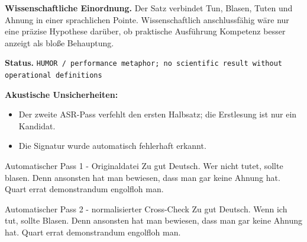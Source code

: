\documentclass[11pt,a4paper]{article}
\newcommand{\status}[1]{\texttt{#1}}
\begin{document}
\textbf{Wissenschaftliche Einordnung.} Der Satz verbindet Tun, Blasen, Tuten und Ahnung in einer sprachlichen Pointe. Wissenschaftlich anschlussfähig wäre nur eine präzise Hypothese darüber, ob praktische Ausführung Kompetenz besser anzeigt als bloße Behauptung.

\textbf{Status.} \status{HUMOR / performance metaphor; no scientific result without operational definitions}

\textbf{Akustische Unsicherheiten:}
\begin{itemize}
\item Der zweite ASR-Pass verfehlt den ersten Halbsatz; die Erstlesung ist nur ein Kandidat.
\item Die Signatur wurde automatisch fehlerhaft erkannt.
\end{itemize}

\begin{asrbox}{Automatischer Pass 1 - Originaldatei}
Zu gut Deutsch. Wer nicht tutet, sollte blasen. Denn ansonsten hat man bewiesen, dass man gar keine Ahnung hat. Quart errat demonstrandum engolfloh man.
\end{asrbox}

\begin{asrbox}{Automatischer Pass 2 - normalisierter Cross-Check}
Zu gut Deutsch. Wenn ich tut, sollte Blasen. Denn ansonsten hat man bewiesen, dass man gar keine Ahnung hat. Quart errat demonstrandum engolfloh man.
\end{asrbox}
\end{document}
